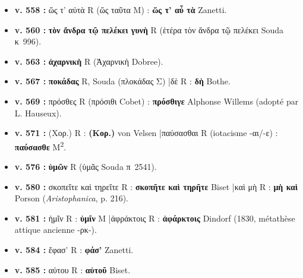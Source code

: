 \documentclass[10pt, a4paper, twoside]{book}
\renewcommand{\_}{\origunderscore\penalty0\relax}
\providecommand{\italique}[1]{\emph{#1}}
\providecommand{\lecon}[1]{\textbf{#1}}
\providecommand{\expo}[1]{\textsuperscript{#1}}
\providecommand{\Mon}{M}
\providecommand{\espApp}{\hspace{0.5em}|\hspace{0.5em}}
\begin{document}
\begin{itemize}
\begin{itemize}
    \item \textbf{v. 558 :} ὥς τ' αὐτὰ R (ὥς ταῦτα \Mon{}) : \lecon{ὥς τ' αὖ τὰ} Zanetti.
    \item \textbf{v. 560 :} \lecon{τὸν ἄνδρα τῷ πελέκει γυνὴ} R (ἑτέρα τὸν ἄνδρα τῷ πελέκει Souda κ~996).
    \item \textbf{v. 563 :} \lecon{ἀχαρνικὴ} R (Ἀχαρνικὴ Dobree).
    \item \textbf{v. 567 :} \lecon{ποκάδας} R, Souda (πλοκάδας Σ) \espApp δὲ R : \lecon{δὴ} Bothe.
    \item \textbf{v. 569 :} πρόσθες R (πρόσιθι Cobet) : \lecon{πρόσθιγε} Alphonse Willems (adopté par L. Hauseux).
    \item \textbf{v. 571 :} (Χορ.) R : \lecon{(Κορ.)} von Velsen \espApp παύσασθαι R (iotacisme -αι/-ε) : \lecon{παύσασθε} \Mon{}\expo{2}.
    \item \textbf{v. 576 :} \lecon{ὑμῶν} R (ὑμᾶς Souda π~2541).
    \item \textbf{v. 580 :} σκοπεἴτε καὶ τηρεἴτε R : \lecon{σκοπῆτε καὶ τηρῆτε} Biset \espApp καὶ μὴ R : \lecon{μὴ καὶ} Porson (\italique{Aristophanica}, p. 216).
    \item \textbf{v. 581 :} ἡμῖν R : \lecon{ὑμῖν} \Mon{} \espApp ἀφράκτοις R : \lecon{ἀφάρκτοις} Dindorf (1830, métathèse attique ancienne -ρκ-).
    \item \textbf{v. 584 :} ἔφασ' R : \lecon{φάσ'} Zanetti.
    \item \textbf{v. 585 :} αὐτου R : \lecon{αὑτοῦ} Biset.
  \end{itemize}
\end{itemize}
\end{document}
